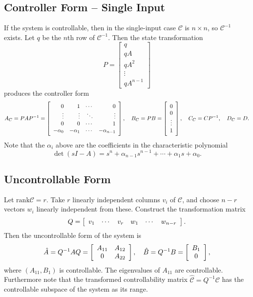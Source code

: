 \documentclass{report}
\begin{document}
\subsection{Controller Form -- Single Input}
If the system is controllable, then in the single-input case
$\mathcal{C}$ is $n \times n$, so $\mathcal{C}^{-1}$ exists. Let $q$
be the $n$th row of $\mathcal{C}^{-1}$. Then the state transformation
$$
P =
\left[\begin{array}{c}
  q        \\
  q A      \\
  q A^2    \\
  \vdots   \\
  q A^{n-1}
\end{array}\right]
$$
produces the controller form
$$
A_C = P A P^{-1} =
\left[\begin{array}{r r r r}
  0         & 1         & \cdots & 0      \\
  \vdots    & \vdots    & \ddots & \vdots \\
  0         & 0         & \cdots & 1      \\
  -\alpha_0 & -\alpha_1 & \cdots & -\alpha_{n-1}
\end{array}\right], \quad
B_C = PB =
\left[\begin{array}{c}
  0      \\
  0      \\
  \vdots \\
  1
\end{array}\right], \quad
C_C = CP^{-1}, \quad
D_C = D.
$$
Note that the $\alpha_i$ above are the coefficients in the
characteristic polynomial
$$
\det (sI - A) =
s^n + \alpha_{n-1} s^{n-1} + \cdots + \alpha_1 s + \alpha_0.
$$

\subsection{Uncontrollable Form }
Let $\mathrm{rank} \mathcal{C} = r$. Take $r$ linearly independent
columns $v_i$ of $\mathcal{C}$, and choose $n - r$ vectors $w_i$ linearly
independent from these. Construct the transformation matrix
$$
Q =
\left[\begin{array}{c c c c c c}
  v_1 & \cdots & v_r & w_1 & \cdots & w_{n-r} \\
\end{array}\right].
$$
Then the uncontrollable form of the system is
$$
\hat{A} = Q^{-1} A Q =
\left[\begin{array}{c c}
  A_{11} & A_{12} \\
  0     & A_{22}
\end{array}\right], \quad
\hat{B} = Q^{-1} B =
\left[\begin{array}{c}
  B_1 \\
  0
\end{array}\right],
$$
where $(A_{11}, B_1)$ is controllable. The eigenvalues of $A_{11}$ are
controllable. Furthermore note that the transformed controllability
matrix $\hat{\mathcal{C}} = Q^{-1} \mathcal{C}$ has the controllable
subspace of the system as its range.
\end{document}
